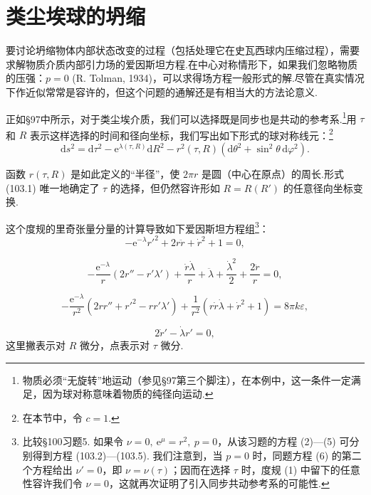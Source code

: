\section{类尘埃球的坍缩}

要讨论坍缩物体内部状态改变的过程（包括处理它在史瓦西球内压缩过程），需要求解物质介质内部引力场的爱因斯坦方程.在中心对称情形下，如果我们忽略物质的压强：$p=0$ (R. Tolman, 1934)，可以求得场方程一般形式的解.尽管在真实情况下作近似常常是容许的，但这个问题的通解还是有相当大的方法论意义.

正如§97中所示，对于类尘埃介质，我们可以选择既是同步也是共动的参考系.\footnote{物质必须“无旋转”地运动（参见§97第三个脚注），在本例中，这一条件一定满足，因为球对称意味着物质的纯径向运动.}用 $\tau$ 和 $R$ 表示这样选择的时间和径向坐标，我们写出如下形式的球对称线元：\footnote{在本节中，令 $c=1$.}
\begin{equation}
  \mathrm{d}s^{2}=\mathrm{d}\tau^{2}
  -\mathrm{e}^{\lambda(\tau,R)}\mathrm{d}R^{2}
  -r^{2}(\tau,R)(\mathrm{d}\theta^{2}
  +\sin^{2}\theta\,\mathrm{d}\varphi^{2}).
\end{equation}

函数 $r(\tau,R)$ 是如此定义的“半径”，使 $2\pi r$ 是圆（中心在原点）的周长.形式 (103.1) 唯一地确定了 $\tau$ 的选择，但仍然容许形如 $R=R(R')$ 的任意径向坐标变换.

这个度规的里奇张量分量的计算导致如下爱因斯坦方程组\footnote{比较§100习题5. 如果令 $\nu=0,\ \mathrm{e}^{\mu}=r^{2},\ p=0$，从该习题的方程 (2)—(5) 可分别得到方程 (103.2)—(103.5). 我们注意到，当 $p=0$ 时，同题方程 (6) 的第二个方程给出 $\nu'=0$，即 $\nu=\nu(\tau)$；因而在选择 $\tau$ 时，度规 (1) 中留下的任意性容许我们令 $\nu=0$，这就再次证明了引入同步共动参考系的可能性.}：
\begin{equation}
  -\mathrm{e}^{-\lambda}r'^{2}+2r\ddot{r}+\dot{r}^{2}+1=0,
\end{equation}

\begin{equation}
  -\frac{\mathrm{e}^{-\lambda}}{r}(2r''-r'\lambda')
  +\frac{\dot{r}\dot{\lambda}}{r}
  +\ddot{\lambda}+\frac{\dot{\lambda}^{2}}{2}
  +\frac{2\ddot{r}}{r}=0,
\end{equation}

\begin{equation}
  -\frac{\mathrm{e}^{-\lambda}}{r^{2}}
  (2rr''+r'^{2}-rr'\lambda')
  +\frac{1}{r^{2}}(r\dot{r}\dot{\lambda}+\dot{r}^{2}+1)
  =8\pi k\varepsilon,
\end{equation}

\begin{equation}
  2\dot{r}'-\dot{\lambda}r'=0,
\end{equation}
这里撇表示对 $R$ 微分，点表示对 $\tau$ 微分.

